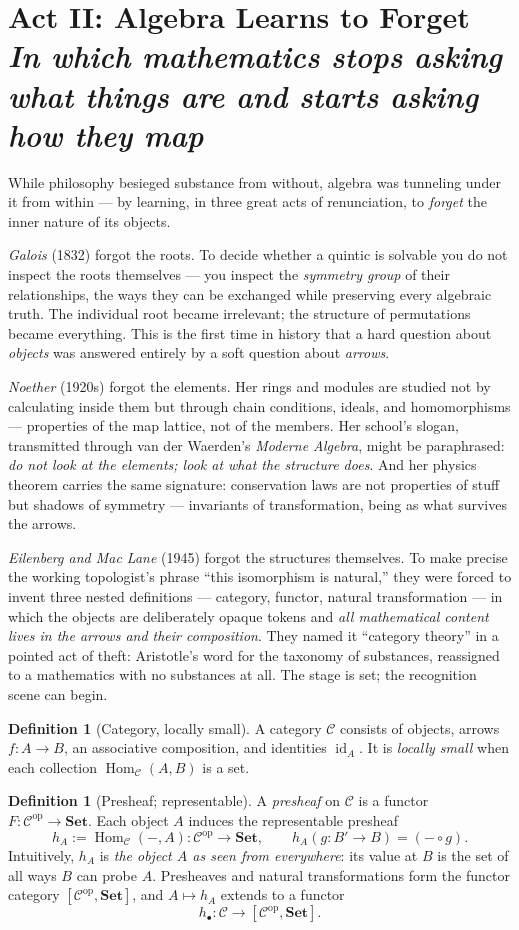 \documentclass[11pt]{article}
\theoremstyle{plain}
\theoremstyle{definition}
\newtheorem{definition}[theorem]{Definition}
\theoremstyle{remark}
\newcommand{\C}{\mathcal{C}}
\newcommand{\Set}{\mathbf{Set}}
\newcommand{\Hom}{\operatorname{Hom}}
\newcommand{\id}{\operatorname{id}}
\newcommand{\op}{\mathrm{op}}
\newcommand{\act}[2]{\section{#1 \\ {\normalsize\normalfont\itshape #2}}}
\begin{document}
\act{Act II: Algebra Learns to Forget}{In which mathematics stops asking what things are and starts asking how they map}

While philosophy besieged substance from without, algebra was tunneling under it from within --- by learning, in three great acts of renunciation, to \emph{forget} the inner nature of its objects.

\emph{Galois} (1832) forgot the roots. To decide whether a quintic is solvable you do not inspect the roots themselves --- you inspect the \emph{symmetry group} of their relationships, the ways they can be exchanged while preserving every algebraic truth. The individual root became irrelevant; the structure of permutations became everything. This is the first time in history that a hard question about \emph{objects} was answered entirely by a soft question about \emph{arrows}.

\emph{Noether} (1920s) forgot the elements. Her rings and modules are studied not by calculating inside them but through chain conditions, ideals, and homomorphisms --- properties of the map lattice, not of the members. Her school's slogan, transmitted through van der Waerden's \emph{Moderne Algebra}, might be paraphrased: \emph{do not look at the elements; look at what the structure does}. And her physics theorem carries the same signature: conservation laws are not properties of stuff but shadows of symmetry --- invariants of transformation, being as what survives the arrows.

\emph{Eilenberg and Mac Lane} (1945) forgot the structures themselves. To make precise the working topologist's phrase ``this isomorphism is natural,'' they were forced to invent three nested definitions --- category, functor, natural transformation --- in which the objects are deliberately opaque tokens and \emph{all mathematical content lives in the arrows and their composition}. They named it ``category theory'' in a pointed act of theft: Aristotle's word for the taxonomy of substances, reassigned to a mathematics with no substances at all. The stage is set; the recognition scene can begin.

\begin{definition}[Category, locally small]
A category $\C$ consists of objects, arrows $f\colon A \to B$, an associative composition, and identities $\id_A$. It is \emph{locally small} when each collection $\Hom_\C(A,B)$ is a set.
\end{definition}

\begin{definition}[Presheaf; representable]
A \emph{presheaf} on $\C$ is a functor $F\colon \C^{\op} \to \Set$. Each object $A$ induces the representable presheaf
\[
h_A := \Hom_\C(-,A)\colon \C^{\op} \to \Set,
\qquad
h_A(g\colon B' \to B) = (-\circ g).
\]
Intuitively, $h_A$ is \emph{the object $A$ as seen from everywhere}: its value at $B$ is the set of all ways $B$ can probe $A$. Presheaves and natural transformations form the functor category $[\C^{\op}, \Set]$, and $A \mapsto h_A$ extends to a functor
\[
h_{\bullet}\colon \C \longrightarrow [\C^{\op},\Set].
\]
\end{definition}
\end{document}
